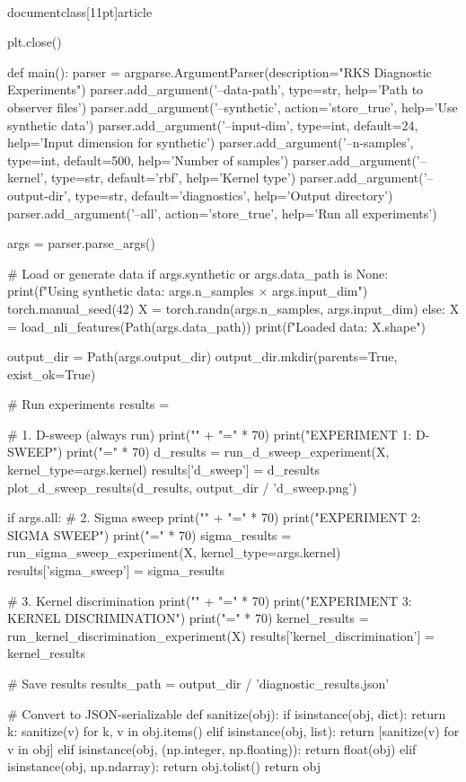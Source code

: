 \\documentclass[11pt]{article}
\begin{document}
\begin{CodeBlock}
    plt.close()


def main():
    parser = argparse.ArgumentParser(description="RKS Diagnostic Experiments")
    parser.add_argument('--data-path', type=str, help='Path to observer files')
    parser.add_argument('--synthetic', action='store_true', help='Use synthetic data')
    parser.add_argument('--input-dim', type=int, default=24, help='Input dimension for synthetic')
    parser.add_argument('--n-samples', type=int, default=500, help='Number of samples')
    parser.add_argument('--kernel', type=str, default='rbf', help='Kernel type')
    parser.add_argument('--output-dir', type=str, default='diagnostics', help='Output directory')
    parser.add_argument('--all', action='store_true', help='Run all experiments')
    
    args = parser.parse_args()
    
    # Load or generate data
    if args.synthetic or args.data_path is None:
        print(f"Using synthetic data: {args.n_samples} × {args.input_dim}")
        torch.manual_seed(42)
        X = torch.randn(args.n_samples, args.input_dim)
    else:
        X = load_nli_features(Path(args.data_path))
        print(f"Loaded data: {X.shape}")
    
    output_dir = Path(args.output_dir)
    output_dir.mkdir(parents=True, exist_ok=True)
    
    # Run experiments
    results = {}
    
    # 1. D-sweep (always run)
    print("\n" + "=" * 70)
    print("EXPERIMENT 1: D-SWEEP")
    print("=" * 70)
    d_results = run_d_sweep_experiment(X, kernel_type=args.kernel)
    results['d_sweep'] = d_results
    plot_d_sweep_results(d_results, output_dir / 'd_sweep.png')
    
    if args.all:
        # 2. Sigma sweep
        print("\n" + "=" * 70)
        print("EXPERIMENT 2: SIGMA SWEEP")
        print("=" * 70)
        sigma_results = run_sigma_sweep_experiment(X, kernel_type=args.kernel)
        results['sigma_sweep'] = sigma_results
        
        # 3. Kernel discrimination
        print("\n" + "=" * 70)
        print("EXPERIMENT 3: KERNEL DISCRIMINATION")
        print("=" * 70)
        kernel_results = run_kernel_discrimination_experiment(X)
        results['kernel_discrimination'] = kernel_results
    
    # Save results
    results_path = output_dir / 'diagnostic_results.json'
    
    # Convert to JSON-serializable
    def sanitize(obj):
        if isinstance(obj, dict):
            return {k: sanitize(v) for k, v in obj.items()}
        elif isinstance(obj, list):
            return [sanitize(v) for v in obj]
        elif isinstance(obj, (np.integer, np.floating)):
            return float(obj)
        elif isinstance(obj, np.ndarray):
            return obj.tolist()
        return obj
    

\end{CodeBlock}
\end{document}
